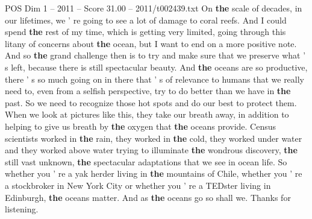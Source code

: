 \begin{textsample}{POS Dim 1 – 2011 – Score 31.00 – 2011/t002439.txt}
On \textbf{the} scale of decades, in our lifetimes, we ' re going to see a lot of damage to coral reefs.
And I could spend \textbf{the} rest of my time, which is getting very limited, going through this litany of concerns about \textbf{the} ocean, but I want to end on a more positive note.
And so \textbf{the} grand challenge then is to try and make sure that we preserve what ' s left, because there is still spectacular beauty.
And \textbf{the} oceans are so productive, there ' s so much going on in there that ' s of relevance to humans that we really need to, even from a selfish perspective, try to do better than we have in \textbf{the} past.
So we need to recognize those hot spots and do our best to protect them.
When we look at pictures like this, they take our breath away, in addition to helping to give us breath by \textbf{the} oxygen that \textbf{the} oceans provide.
Census scientists worked in \textbf{the} rain, they worked in \textbf{the} cold, they worked under water and they worked above water trying to illuminate \textbf{the} wondrous discovery, \textbf{the} still vast unknown, \textbf{the} spectacular adaptations that we see in ocean life.
So whether you ' re a yak herder living in \textbf{the} mountains of Chile, whether you ' re a stockbroker in New York City or whether you ' re a TEDster living in Edinburgh, \textbf{the} oceans matter.
And as \textbf{the} oceans go so shall we.
Thanks for listening.

\end{textsample}

